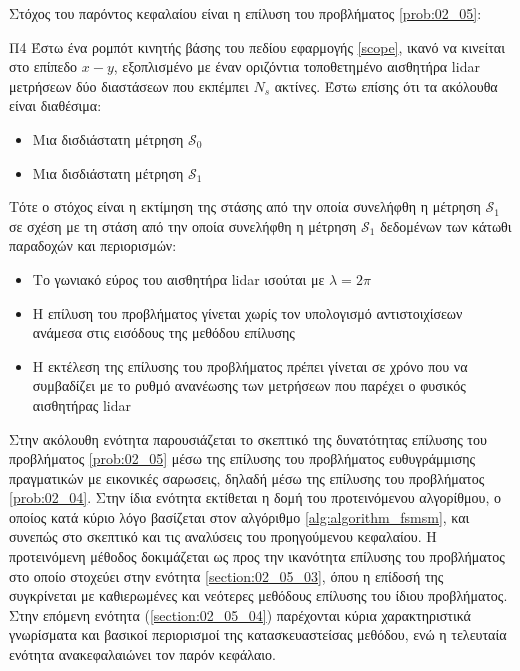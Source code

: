 Στόχος του παρόντος κεφαλαίου είναι η επίλυση του προβλήματος \ref{prob:02_05}:

\begin{bw_box}
\begin{customproblem}{Π4}
  \label{prob:02_05}
  Έστω ένα ρομπότ κινητής βάσης του πεδίου εφαρμογής \ref{scope}, ικανό να
  κινείται στο επίπεδο $x-y$, εξοπλισμένο με έναν οριζόντια τοποθετημένο
  αισθητήρα lidar μετρήσεων δύο διαστάσεων που εκπέμπει $N_s$ ακτίνες. Έστω
  επίσης ότι τα ακόλουθα είναι διαθέσιμα:
  \begin{itemize}
    \item Μια δισδιάστατη μέτρηση $\mathcal{S}_0$
    \item Μια δισδιάστατη μέτρηση $\mathcal{S}_1$
  \end{itemize}
\end{customproblem}
Τότε ο στόχος είναι η εκτίμηση της στάσης από την οποία συνελήφθη η μέτρηση
$\mathcal{S}_1$ σε σχέση με τη στάση από την οποία συνελήφθη η μέτρηση
$\mathcal{S}_1$ δεδομένων των κάτωθι παραδοχών και περιορισμών:
\begin{itemize}
  \item Το γωνιακό εύρος του αισθητήρα lidar ισούται με $\lambda = 2\pi$
  \item Η επίλυση του προβλήματος γίνεται χωρίς τον υπολογισμό αντιστοιχίσεων
        ανάμεσα στις εισόδους της μεθόδου επίλυσης
  \item Η εκτέλεση της επίλυσης του προβλήματος πρέπει γίνεται σε χρόνο που να
        συμβαδίζει με το ρυθμό ανανέωσης των μετρήσεων που παρέχει ο φυσικός
        αισθητήρας lidar
\end{itemize}

\end{bw_box}

Στην ακόλουθη ενότητα παρουσιάζεται το σκεπτικό της δυνατότητας επίλυσης του
προβλήματος \ref{prob:02_05} μέσω της επίλυσης του προβλήματος ευθυγράμμισης
πραγματικών με εικονικές σαρωσεις, δηλαδή μέσω της επίλυσης του προβλήματος
\ref{prob:02_04}. Στην ίδια ενότητα εκτίθεται η δομή του προτεινόμενου
αλγορίθμου, ο οποίος κατά κύριο λόγο βασίζεται στον αλγόριθμο
\ref{alg:algorithm_fsmsm}, και συνεπώς στο σκεπτικό και τις αναλύσεις του
προηγούμενου κεφαλαίου. Η προτεινόμενη μέθοδος δοκιμάζεται ως προς την
ικανότητα επίλυσης του προβλήματος στο οποίο στοχεύει στην ενότητα
\ref{section:02_05_03}, όπου η επίδοσή της συγκρίνεται με καθιερωμένες και
νεότερες μεθόδους επίλυσης του ίδιου προβλήματος. Στην επόμενη ενότητα
(\ref{section:02_05_04}) παρέχονται κύρια χαρακτηριστικά γνωρίσματα και
βασικοί περιορισμοί της κατασκευαστείσας μεθόδου, ενώ η τελευταία ενότητα
ανακεφαλαιώνει τον παρόν κεφάλαιο.
